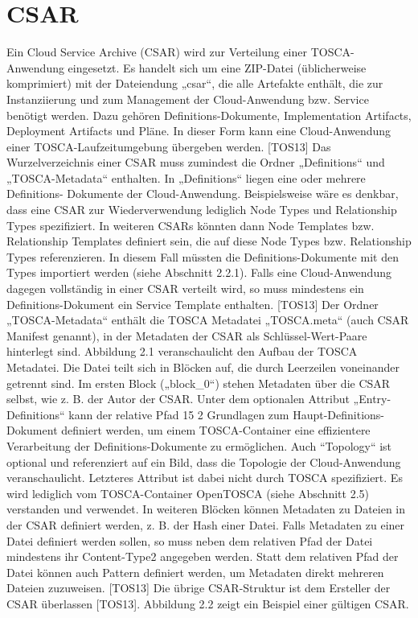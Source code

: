 \section{CSAR} \label{sec:csar}
Ein Cloud Service Archive (CSAR) wird zur Verteilung einer TOSCA-Anwendung
eingesetzt. Es handelt sich um eine ZIP-Datei (üblicherweise komprimiert) mit der
Dateiendung „csar“, die alle Artefakte enthält, die zur Instanziierung und zum
Management der Cloud-Anwendung bzw. Service benötigt werden. Dazu gehören
Definitions-Dokumente, Implementation Artifacts, Deployment Artifacts und Pläne.
In dieser Form kann eine Cloud-Anwendung einer TOSCA-Laufzeitumgebung
übergeben werden. [TOS13]
Das Wurzelverzeichnis einer CSAR muss zumindest die Ordner „Definitions“ und
„TOSCA-Metadata“ enthalten. In „Definitions“ liegen eine oder mehrere Definitions-
Dokumente der Cloud-Anwendung. Beispielsweise wäre es denkbar, dass eine CSAR
zur Wiederverwendung lediglich Node Types und Relationship Types spezifiziert. In
weiteren CSARs könnten dann Node Templates bzw. Relationship Templates definiert
sein, die auf diese Node Types bzw. Relationship Types referenzieren. In diesem
Fall müssten die Definitions-Dokumente mit den Types importiert werden (siehe
Abschnitt 2.2.1). Falls eine Cloud-Anwendung dagegen vollständig in einer CSAR
verteilt wird, so muss mindestens ein Definitions-Dokument ein Service Template
enthalten. [TOS13]
Der Ordner „TOSCA-Metadata“ enthält die TOSCA Metadatei „TOSCA.meta“
(auch CSAR Manifest genannt), in der Metadaten der CSAR als Schlüssel-Wert-Paare
hinterlegt sind. Abbildung 2.1 veranschaulicht den Aufbau der TOSCA Metadatei.
Die Datei teilt sich in Blöcken auf, die durch Leerzeilen voneinander getrennt sind. Im
ersten Block („block_0“) stehen Metadaten über die CSAR selbst, wie z. B. der Autor
der CSAR. Unter dem optionalen Attribut „Entry-Definitions“ kann der relative Pfad
15
2 Grundlagen
zum Haupt-Definitions-Dokument definiert werden, um einem TOSCA-Container eine
effizientere Verarbeitung der Definitions-Dokumente zu ermöglichen. Auch “Topology“
ist optional und referenziert auf ein Bild, dass die Topologie der Cloud-Anwendung
veranschaulicht. Letzteres Attribut ist dabei nicht durch TOSCA spezifiziert. Es wird
lediglich vom TOSCA-Container OpenTOSCA (siehe Abschnitt 2.5) verstanden und
verwendet.
In weiteren Blöcken können Metadaten zu Dateien in der CSAR definiert werden,
z. B. der Hash einer Datei. Falls Metadaten zu einer Datei definiert werden sollen, so
muss neben dem relativen Pfad der Datei mindestens ihr Content-Type2 angegeben
werden. Statt dem relativen Pfad der Datei können auch Pattern definiert werden,
um Metadaten direkt mehreren Dateien zuzuweisen. [TOS13]
Die übrige CSAR-Struktur ist dem Ersteller der CSAR überlassen [TOS13]. Abbildung
2.2 zeigt ein Beispiel einer gültigen CSAR.
